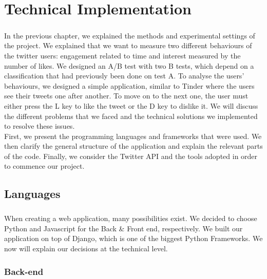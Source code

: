 \chapter{Technical Implementation}

\paragraph{}
In the previous chapter, we explained the methods and experimental settings of the project. We explained that we want to measure two different behaviours of the twitter users: engagement related to time and interest measured by the number of likes. We designed an A/B test with two B tests, which depend on a classification that had previously been done on test A. To analyse the users' behaviours, we designed a simple application, similar to Tinder where the users see their tweets one after another. To move on to the next one, the user must either press the L key to like the tweet or the D key to dislike it. We will discuss the different problems that we faced and the technical solutions we implemented to resolve these issues. \\
First, we present the programming languages and frameworks that were used. We then clarify the general structure of the application and explain the relevant parts of the code. Finally, we consider the Twitter API and the tools adopted in order to commence our project.

\section{Languages}

\paragraph{}
When creating a web application, many possibilities exist. We decided to choose Python and Javascript for the Back \& Front end, respectively. We built our application on top of Django, which is one of the biggest Python Frameworks. We now will explain our decisions at the technical level.

\subsection{Back-end}

